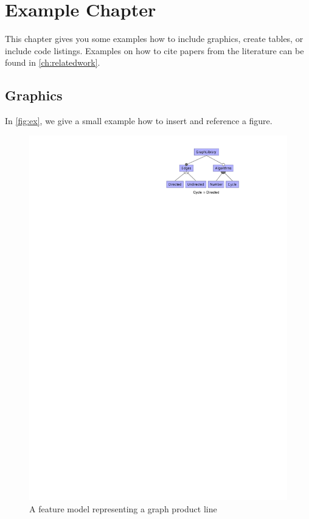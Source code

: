 \section*{Example Chapter}\label{ch:example_chapter}

This chapter gives you some examples how to include graphics, create tables, or include code listings.
Examples on how to cite papers from the literature can be found in \autoref{ch:relatedwork}.

\subsection*{Graphics}

In \autoref{fig:ex}, we give a small example how to insert and reference a figure.

\begin{figure}[htbp]
	\centering
		\includegraphics[scale=1.25]{gfx/example}
	\caption{A feature model representing a graph product line}
	\label{fig:ex}
\end{figure}

